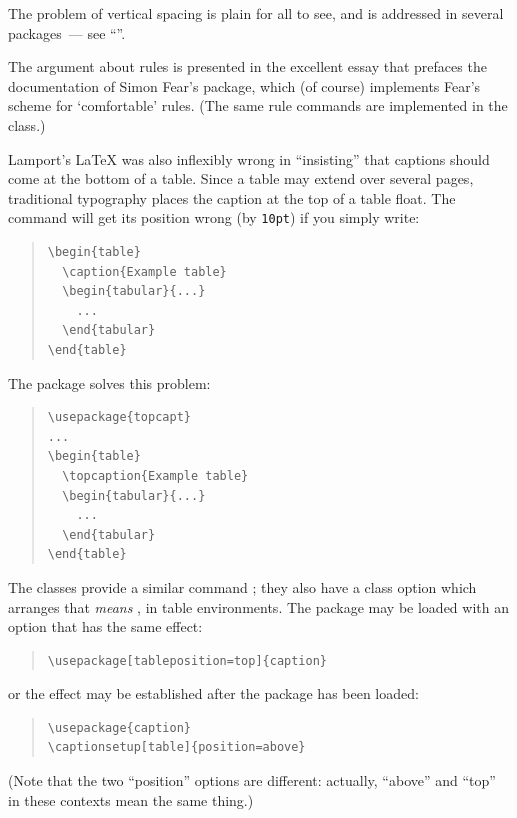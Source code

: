The problem of vertical spacing is plain for all to see, and is
addressed in several packages~--- see %
``''.

The argument about rules is presented in the excellent essay that
prefaces the documentation of Simon Fear's  package,
which (of course) implements Fear's scheme for `comfortable' rules.
(The same rule commands are implemented in the  class.)

Lamport's \LaTeX{} was also inflexibly wrong in ``insisting'' that
captions should come at the bottom of a table.  Since a table may
extend over several pages, traditional typography places the caption
at the top of a table float.  The  command will get its
position wrong (by \texttt{10pt}) if you simply write:
\begin{quote}
\begin{verbatim}
\begin{table}
  \caption{Example table}
  \begin{tabular}{...}
    ...
  \end{tabular}
\end{table}
\end{verbatim}
\end{quote}
The  package solves this problem:
\begin{quote}
\begin{verbatim}
\usepackage{topcapt}
...
\begin{table}
  \topcaption{Example table}
  \begin{tabular}{...}
    ...
  \end{tabular}
\end{table}
\end{verbatim}
\end{quote}
The  classes provide a similar command
; they also have a class option
 which arranges that 
\emph{means} , in table environments.  The
 package may be loaded
with an option that has the same effect:
\begin{quote}
\begin{verbatim}
\usepackage[tableposition=top]{caption}
\end{verbatim}
\end{quote}
or the effect may be established after the package has been  loaded:
\begin{quote}
\begin{verbatim}
\usepackage{caption}
\captionsetup[table]{position=above}
\end{verbatim}
\end{quote}
(Note that the two ``position'' options are different: actually,
``above'' and ``top'' in these contexts mean the same thing.)

